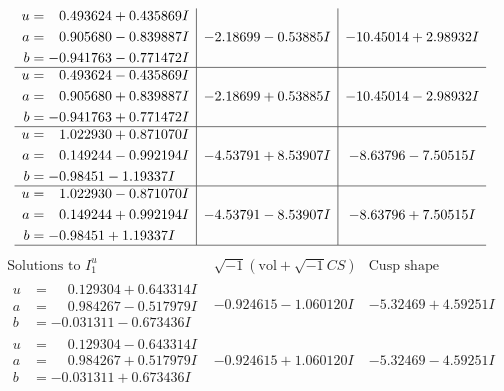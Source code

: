 \documentclass[1p]{elsarticle_modified}
\theoremstyle{definition}
\newcommand{\I}{\sqrt{-1}}
\begin{document}
$$\begin{array}{c|c|c}
\begin{aligned}
u &= \phantom{-}0.493624 + 0.435869 I \\
a &= \phantom{-}0.905680 - 0.839887 I \\
b &= -0.941763 - 0.771472 I\end{aligned}
 & -2.18699 - 0.53885 I & -10.45014 + 2.98932 I \\ \hline\begin{aligned}
u &= \phantom{-}0.493624 - 0.435869 I \\
a &= \phantom{-}0.905680 + 0.839887 I \\
b &= -0.941763 + 0.771472 I\end{aligned}
 & -2.18699 + 0.53885 I & -10.45014 - 2.98932 I \\ \hline\begin{aligned}
u &= \phantom{-}1.022930 + 0.871070 I \\
a &= \phantom{-}0.149244 - 0.992194 I \\
b &= -0.98451 - 1.19337 I\end{aligned}
 & -4.53791 + 8.53907 I & -8.63796 - 7.50515 I \\ \hline\begin{aligned}
u &= \phantom{-}1.022930 - 0.871070 I \\
a &= \phantom{-}0.149244 + 0.992194 I \\
b &= -0.98451 + 1.19337 I\end{aligned}
 & -4.53791 - 8.53907 I & -8.63796 + 7.50515 I\\
 \hline 
 \end{array}$$\newpage$$\begin{array}{c|c|c}  
\text{Solutions to }I^u_{1}& \I (\text{vol} + \sqrt{-1}CS) & \text{Cusp shape}\\
 \hline 
\begin{aligned}
u &= \phantom{-}0.129304 + 0.643314 I \\
a &= \phantom{-}0.984267 - 0.517979 I \\
b &= -0.031311 - 0.673436 I\end{aligned}
 & -0.924615 - 1.060120 I & -5.32469 + 4.59251 I \\ \hline\begin{aligned}
u &= \phantom{-}0.129304 - 0.643314 I \\
a &= \phantom{-}0.984267 + 0.517979 I \\
b &= -0.031311 + 0.673436 I\end{aligned}
 & -0.924615 + 1.060120 I & -5.32469 - 4.59251 I \\ \hline\begin{aligned}

\end{aligned}
\end{array}$$
\end{document}
